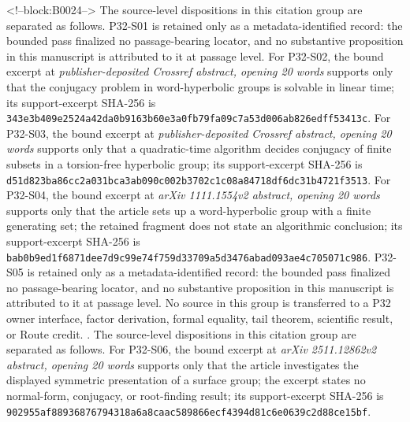 \documentclass[11pt]{article}
\begin{document}
<!--block:B0024-->
The source-level dispositions in this citation group are separated as follows.
P32-S01 is retained only as a metadata-identified record: the bounded pass finalized no passage-bearing locator, and no substantive proposition in this manuscript is attributed to it at passage level.
For P32-S02, the bound excerpt at \emph{publisher-deposited Crossref abstract, opening 20 words} supports only that the conjugacy problem in word-hyperbolic groups is solvable in linear time; its support-excerpt SHA-256 is \texttt{343e3b40\allowbreak{}9e2524a4\allowbreak{}2da0b916\allowbreak{}3b60e3a0\allowbreak{}fb79fa09\allowbreak{}c7a53d00\allowbreak{}6ab826ed\allowbreak{}ff53413c}.
For P32-S03, the bound excerpt at \emph{publisher-deposited Crossref abstract, opening 20 words} supports only that a quadratic-time algorithm decides conjugacy of finite subsets in a torsion-free hyperbolic group; its support-excerpt SHA-256 is \texttt{d51d823b\allowbreak{}a86cc2a0\allowbreak{}31bca3ab\allowbreak{}090c002b\allowbreak{}3702c1c0\allowbreak{}8a84718d\allowbreak{}f6dc31b4\allowbreak{}721f3513}.
For P32-S04, the bound excerpt at \emph{arXiv 1111.1554v2 abstract, opening 20 words} supports only that the article sets up a word-hyperbolic group with a finite generating set; the retained fragment does not state an algorithmic conclusion; its support-excerpt SHA-256 is \texttt{bab0b9ed\allowbreak{}1f6871de\allowbreak{}e7d9c99e\allowbreak{}74f759d3\allowbreak{}3709a5d3\allowbreak{}476abad0\allowbreak{}93ae4c70\allowbreak{}5071c986}.
P32-S05 is retained only as a metadata-identified record: the bounded pass finalized no passage-bearing locator, and no substantive proposition in this manuscript is attributed to it at passage level.
No source in this group is transferred to a P32 owner interface, factor derivation, formal equality, tail theorem, scientific result, or Route credit.
\citep{P32-S01,P32-S02,P32-S03,P32-S04,P32-S05}.
The source-level dispositions in this citation group are separated as follows.
For P32-S06, the bound excerpt at \emph{arXiv 2511.12862v2 abstract, opening 20 words} supports only that the article investigates the displayed symmetric presentation of a surface group; the excerpt states no normal-form, conjugacy, or root-finding result; its support-excerpt SHA-256 is \texttt{902955af\allowbreak{}88936876\allowbreak{}794318a6\allowbreak{}a8caac58\allowbreak{}9866ecf4\allowbreak{}394d81c6\allowbreak{}e0639c2d\allowbreak{}88ce15bf}.
\end{document}
